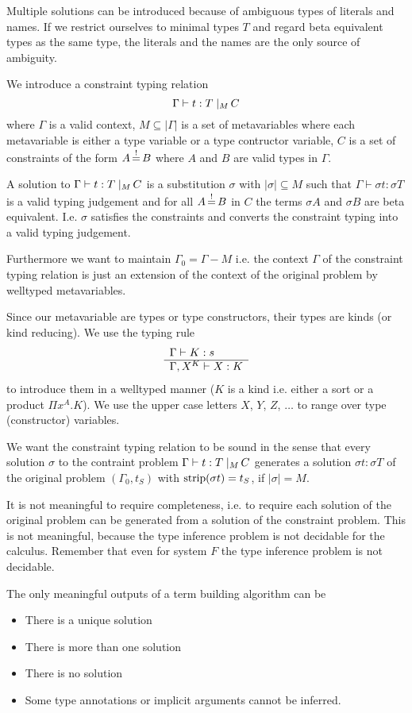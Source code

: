 Multiple solutions can be introduced because of ambiguous types of literals and
names. If we restrict ourselves to minimal types $T$ and regard beta equivalent
types as the same type, the literals and the names are the only source of
ambiguity.


We introduce a constraint typing relation
$$
\Gamma \vdash t:T \; |_{M} \, C
$$
where $\Gamma$ is a valid context, $M \subseteq |\Gamma|$ is a set of
metavariables where each metavariable is either a type variable or a type
contructor variable, $C$ is a set of constraints of the form $A {\,\stackrel{!}{=}\,} B$ where
$A$ and $B$ are valid types in $\Gamma$.

A solution to $\Gamma \vdash t:T \; |_{M} \, C$ is a substitution $\sigma$ with
$|\sigma| \subseteq M$ such that $\Gamma \vdash \sigma t: \sigma T$ is a valid
typing judgement and for all $A{\,\stackrel{!}{=}\,} B$ in $C$ the terms $\sigma A$ and
$\sigma B$ are beta equivalent. I.e. $\sigma$ satisfies the constraints and
converts the constraint typing into a valid typing judgement.

Furthermore we want to maintain $\Gamma_0 = \Gamma - M$ i.e. the context
$\Gamma$ of the constraint typing relation is just an extension of the context
of the original problem by welltyped metavariables.

Since our metavariable are types or type constructors, their types are kinds (or
kind reducing). We use the typing rule
$$
\begin{array}{l} \Gamma \vdash K: s \\ \hline \Gamma, X^K \vdash X: K\end{array}
$$
to introduce them in a welltyped manner ($K$ is a kind i.e. either a sort or a
product $\Pi x^A. K$). We use the upper case letters $X$, $Y$, $Z$, $\ldots$ to
range over type (constructor) variables.


We want the constraint typing relation to be sound in the sense that every
solution $\sigma$ to the contraint problem
$\Gamma \vdash t:T \; |_{M} \, C$
generates a solution $\sigma t:
\sigma T$ of the original problem $(\Gamma_0,t_S)$ with $\text{strip}(\sigma t) =
t_S$, if $|\sigma| = M$.

It is not meaningful to require completeness, i.e. to require each solution of
the original problem can be generated from a solution of the constraint problem.
This is not meaningful, because the type inference problem is not decidable for
the calculus. Remember that even for system $F$ the type inference problem is
not decidable.

The only meaningful outputs of a term building algorithm can be
\begin{itemize}

\item There is a unique solution

\item There is more than one solution

\item There is no solution

\item Some type annotations or implicit arguments cannot be inferred.

\end{itemize}

